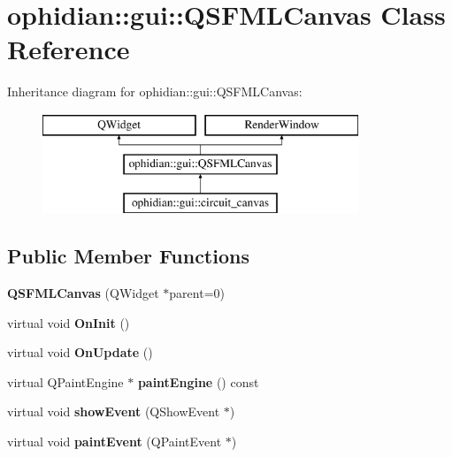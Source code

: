 \hypertarget{classophidian_1_1gui_1_1QSFMLCanvas}{\section{ophidian\-:\-:gui\-:\-:Q\-S\-F\-M\-L\-Canvas Class Reference}
\label{classophidian_1_1gui_1_1QSFMLCanvas}
}
Inheritance diagram for ophidian\-:\-:gui\-:\-:Q\-S\-F\-M\-L\-Canvas\-:\begin{figure}[H]
\begin{center}
\leavevmode
\includegraphics[height=3.000000cm]{classophidian_1_1gui_1_1QSFMLCanvas}
\end{center}
\end{figure}
\subsection*{Public Member Functions}
\begin{DoxyCompactItemize}
\item 
\hypertarget{classophidian_1_1gui_1_1QSFMLCanvas_a8bd360cff58a2682935db2be6eb3ef87}{{\bfseries Q\-S\-F\-M\-L\-Canvas} (Q\-Widget $\ast$parent=0)}\label{classophidian_1_1gui_1_1QSFMLCanvas_a8bd360cff58a2682935db2be6eb3ef87}

\item 
\hypertarget{classophidian_1_1gui_1_1QSFMLCanvas_a2786a67866c13a0f8576279fc87740f4}{virtual void {\bfseries On\-Init} ()}\label{classophidian_1_1gui_1_1QSFMLCanvas_a2786a67866c13a0f8576279fc87740f4}

\item 
\hypertarget{classophidian_1_1gui_1_1QSFMLCanvas_a42075e5ce95ec7954da47d9a565a4e6b}{virtual void {\bfseries On\-Update} ()}\label{classophidian_1_1gui_1_1QSFMLCanvas_a42075e5ce95ec7954da47d9a565a4e6b}

\item 
\hypertarget{classophidian_1_1gui_1_1QSFMLCanvas_ad0d3c887f1157267d76a043cc918547a}{virtual Q\-Paint\-Engine $\ast$ {\bfseries paint\-Engine} () const }\label{classophidian_1_1gui_1_1QSFMLCanvas_ad0d3c887f1157267d76a043cc918547a}

\item 
\hypertarget{classophidian_1_1gui_1_1QSFMLCanvas_a990e2c85d505a4c4292abe294fd70aa9}{virtual void {\bfseries show\-Event} (Q\-Show\-Event $\ast$)}\label{classophidian_1_1gui_1_1QSFMLCanvas_a990e2c85d505a4c4292abe294fd70aa9}

\item 
\hypertarget{classophidian_1_1gui_1_1QSFMLCanvas_a5dee0f547da496f5250d8f9336fb3e8b}{virtual void {\bfseries paint\-Event} (Q\-Paint\-Event $\ast$)}\label{classophidian_1_1gui_1_1QSFMLCanvas_a5dee0f547da496f5250d8f9336fb3e8b}

\end{DoxyCompactItemize}
